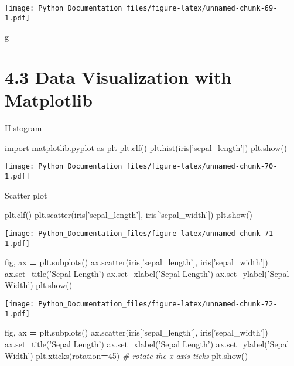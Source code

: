 \documentclass[]{book}
\newenvironment{Shaded}{\begin{snugshade}}{\end{snugshade}}
\newcommand{\CommentTok}[1]{\textcolor[rgb]{0.56,0.35,0.01}{\textit{#1}}}
\newcommand{\DecValTok}[1]{\textcolor[rgb]{0.00,0.00,0.81}{#1}}
\newcommand{\ImportTok}[1]{#1}
\newcommand{\NormalTok}[1]{#1}
\newcommand{\OperatorTok}[1]{\textcolor[rgb]{0.81,0.36,0.00}{\textbf{#1}}}
\newcommand{\StringTok}[1]{\textcolor[rgb]{0.31,0.60,0.02}{#1}}
\theoremstyle{definition}
\theoremstyle{definition}
\theoremstyle{definition}
\theoremstyle{remark}
\begin{document}
\texttt{[image: Python\_Documentation\_files/figure-latex/unnamed-chunk-69-1.pdf]}

g

\hypertarget{data-visualization-with-matplotlib}{%
\section{4.3 Data Visualization with
Matplotlib}\label{data-visualization-with-matplotlib}}

Histogram

\begin{Shaded}
\begin{Highlighting}[]
\ImportTok{import}\NormalTok{ matplotlib.pyplot }\ImportTok{as}\NormalTok{ plt}
\NormalTok{plt.clf()}
\NormalTok{plt.hist(iris[}\StringTok{'sepal_length'}\NormalTok{])}
\NormalTok{plt.show()}
\end{Highlighting}
\end{Shaded}

\texttt{[image: Python\_Documentation\_files/figure-latex/unnamed-chunk-70-1.pdf]}

Scatter plot

\begin{Shaded}
\begin{Highlighting}[]
\NormalTok{plt.clf()}
\NormalTok{plt.scatter(iris[}\StringTok{'sepal_length'}\NormalTok{], iris[}\StringTok{'sepal_width'}\NormalTok{])}
\NormalTok{plt.show()}
\end{Highlighting}
\end{Shaded}

\texttt{[image: Python\_Documentation\_files/figure-latex/unnamed-chunk-71-1.pdf]}

\begin{Shaded}
\begin{Highlighting}[]
\NormalTok{fig, ax }\OperatorTok{=}\NormalTok{ plt.subplots()}
\NormalTok{ax.scatter(iris[}\StringTok{'sepal_length'}\NormalTok{], iris[}\StringTok{'sepal_width'}\NormalTok{])}
\NormalTok{ax.set_title(}\StringTok{'Sepal Length'}\NormalTok{)}
\NormalTok{ax.set_xlabel(}\StringTok{'Sepal Length'}\NormalTok{)}
\NormalTok{ax.set_ylabel(}\StringTok{'Sepal Width'}\NormalTok{)}
\NormalTok{plt.show()}
\end{Highlighting}
\end{Shaded}

\texttt{[image: Python\_Documentation\_files/figure-latex/unnamed-chunk-72-1.pdf]}

\begin{Shaded}
\begin{Highlighting}[]
\NormalTok{fig, ax }\OperatorTok{=}\NormalTok{ plt.subplots()}
\NormalTok{ax.scatter(iris[}\StringTok{'sepal_length'}\NormalTok{], iris[}\StringTok{'sepal_width'}\NormalTok{])}
\NormalTok{ax.set_title(}\StringTok{'Sepal Length'}\NormalTok{)}
\NormalTok{ax.set_xlabel(}\StringTok{'Sepal Length'}\NormalTok{)}
\NormalTok{ax.set_ylabel(}\StringTok{'Sepal Width'}\NormalTok{)}
\NormalTok{plt.xticks(rotation}\OperatorTok{=}\DecValTok{45}\NormalTok{) }\CommentTok{# rotate the x-axis ticks}
\NormalTok{plt.show()}
\end{Highlighting}
\end{Shaded}
\end{document}
